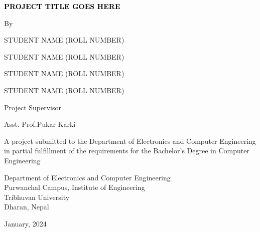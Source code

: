 \begin{titlepage}
    \centering
    
    {\fontsize{12pt}{14pt}\bfseries\textcolor{black}{PROJECT TITLE GOES HERE}\par}
    \vspace{2.0cm}
       {By} \par {STUDENT NAME} ({ROLL NUMBER})
            \par {STUDENT NAME} ({ROLL NUMBER})
            \par {STUDENT NAME} ({ROLL NUMBER})
            \par {STUDENT NAME} ({ROLL NUMBER})
       \vspace{2.0cm}\par
    Project Supervisor\par
    Asst. Prof.Pukar Karki\par
    \vspace{2.0cm}
    {A project submitted to the Department of Electronics and Computer Engineering in partial fulfillment of the requirements for the Bachelor’s Degree in Computer Engineering}\par
        \vspace{2.0cm}\par

    {Department of Electronics and Computer Engineering\\ Purwanchal Campus, Institute of Engineering \\ Tribhuvan University\\ Dharan, Nepal}\par
        \vspace{2.0cm}\par
        
   {January, 2024}
   
\end{titlepage}



